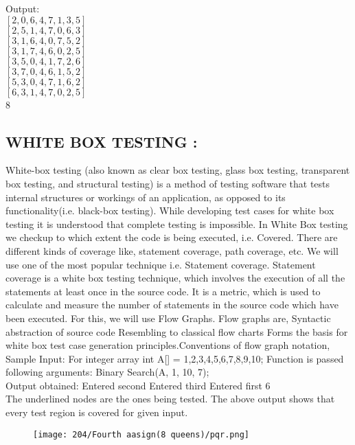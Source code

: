 \documentclass{article}
\begin{document}
	Output:\\
	$[2, 0, 6, 4, 7, 1, 3, 5]$\\
	$[2, 5, 1, 4, 7, 0, 6, 3]$\\
	$[3, 1, 6, 4, 0, 7, 5, 2]$\\
	$[3, 1, 7, 4, 6, 0, 2, 5]$\\
	$[3, 5, 0, 4, 1, 7, 2, 6]$\\
	$[3, 7, 0, 4, 6, 1, 5, 2]$\\
	$[5, 3, 0, 4, 7, 1, 6, 2]$\\
	$[6, 3, 1, 4, 7, 0, 2, 5]$\\
	8\\
	
	\subsection{WHITE BOX TESTING : }
	White-box testing (also known as clear box testing, glass box testing, transparent box testing, and structural testing) is a method of testing software that tests internal structures or workings of an application, as opposed to its functionality(i.e. black-box testing). While developing 
	test cases for white box testing it is understood that complete testing 
	is impossible. In White Box testing we checkup to which extent the code 
	is being executed, i.e. Covered. There are different kinds of coverage like, statement coverage, path coverage, etc. We will use one of the most popular technique i.e. Statement coverage. Statement coverage is a white box testing technique, which involves the execution of all the statements at least once in the source code. It is a metric, which is used to calculate and measure the number of statements in the source code which have been executed. For this, we will use Flow Graphs. Flow graphs are, Syntactic abstraction of source code Resembling to classical flow charts Forms the basis for white box test case generation principles.Conventions of flow graph notation, \\
	Sample Input: For integer array int A[] = 1,2,3,4,5,6,7,8,9,10; Function 
	is passed\\
	following arguments: Binary Search(A, 1, 10, 7);\\
	Output obtained: Entered second Entered third Entered first 6\\
	The underlined nodes are the ones being tested. The above output shows
	that every test region is covered for given input.\\
	
	\begin{figure}[h!]
		\centering
		\texttt{[image: 204/Fourth aasign(8 queens)/pqr.png]}
	\end{figure}
	
\end{document}
